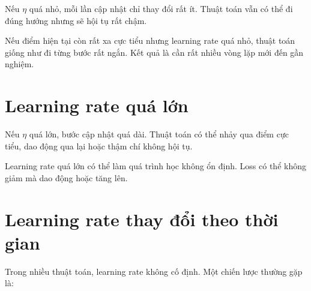 \documentclass[12pt,a4paper]{report}
\begin{document}
Nếu $\eta$ quá nhỏ, mỗi lần cập nhật chỉ thay đổi rất ít. Thuật toán vẫn có thể đi đúng hướng nhưng sẽ hội tụ rất chậm.

\begin{vidu}
Nếu điểm hiện tại còn rất xa cực tiểu nhưng learning rate quá nhỏ, thuật toán giống như đi từng bước rất ngắn. Kết quả là cần rất nhiều vòng lặp mới đến gần nghiệm.
\end{vidu}

\section{Learning rate quá lớn}

Nếu $\eta$ quá lớn, bước cập nhật quá dài. Thuật toán có thể nhảy qua điểm cực tiểu, dao động qua lại hoặc thậm chí không hội tụ.

\begin{center}
\end{center}

\begin{canhbao}
Learning rate quá lớn có thể làm quá trình học không ổn định. Loss có thể không giảm mà dao động hoặc tăng lên.
\end{canhbao}

\section{Learning rate thay đổi theo thời gian}

Trong nhiều thuật toán, learning rate không cố định. Một chiến lược thường gặp là:
\end{document}
